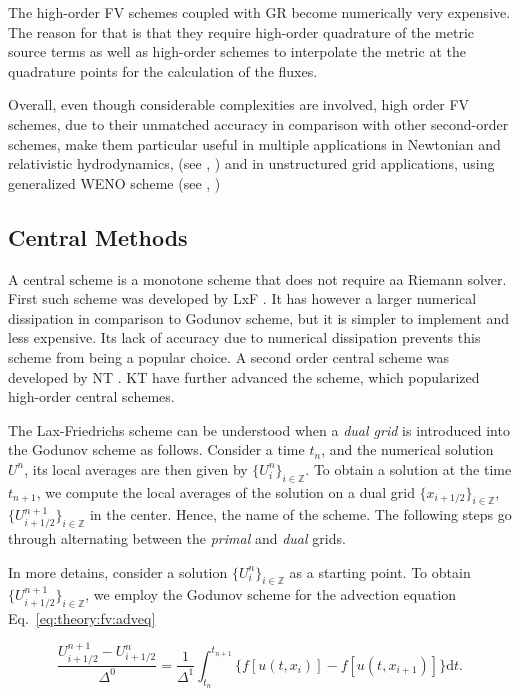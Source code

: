 The high-order \ac{FV} schemes coupled with \ac{GR} become numerically very expensive. The reason for that is that they require high-order quadrature of the metric source terms as well as high-order
schemes to interpolate the metric at the quadrature points for the calculation of the fluxes. 

Overall, even though considerable complexities are involved, high order \ac{FV} schemes, due to their unmatched accuracy in comparison with other second-order schemes, make them particular useful in multiple applications in Newtonian and relativistic hydrodynamics, (see \eg, \citet{Tchekhovskoy:2007zn}) and in unstructured grid applications, using generalized \ac{WENO} scheme (see \eg, \citet{Dumbser:2007})



\subsection{Central Methods}

A central scheme is a monotone scheme that does not require aa Riemann solver. 
%
First such scheme was developed by \ac{LxF} \citep{Lax:1954,Friedrichs:1954}. It has however a larger numerical dissipation in comparison to Godunov scheme, but it is simpler to implement and less expensive. Its lack of accuracy due to numerical dissipation prevents this scheme from being a popular choice. 
%
A second order central scheme was developed by \ac{NT} \citep{Nessyahu:1990}. \ac{KT} \citep{Kurganov:2000} have further advanced the scheme, which popularized high-order central schemes. 

The Lax-Friedrichs scheme can be understood when a \textit{dual grid} is introduced into the Godunov scheme as follows. Consider a time $t_n$, and the numerical solution $U^n$, its local averages are then given by $\{U_{i}^{n}\}_{i\in \mathbb{Z}}$. To obtain a solution at the time $t_{n+1}$, we compute the local averages of the solution on a dual grid $\{x_{i+1/2}\}_{i\in\mathbb{Z}}$, \ie $\{U_{i+1/2}^{n+1}\}_{i\in\mathbb{Z}}$ in the center. Hence, the name of the scheme. The following steps go through alternating between the \textit{primal} and \textit{dual} grids. 

In more detains, consider a solution $\{U_{i}^{n}\}_{i\in \mathbb{Z}}$ as a starting point. To obtain $\{U_{i+1/2}^{n+1}\}_{i\in \mathbb{Z}}$, we employ the Godunov scheme for the advection equation Eq.~\eqref{eq:theory:fv:adveq} 

\begin{equation}
\frac{U_{i+1/2}^{n+1} - U_{i+1/2}^{n}}{\Delta^0} = \frac{1}{\Delta^1}\int_{t_n}^{t_{n+1}}\big\{ f[u(t,x_i)] -f[u(t,x_{i+1})]  \big\}\text{d}t.
\label{eq:theory:fv:central:intadveq}
\end{equation}

